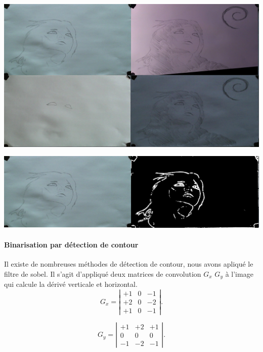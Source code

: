 \begin{center}
\includegraphics[width=\textwidth]{images/diffEclairage.png}
\end{center}

\begin{center}
\includegraphics[width=\textwidth]{images/Threshold1.png}
\end{center}


\paragraph{Binarisation par détection de contour\vspace{0.5cm}\\}

Il existe de nombreuses méthodes de détection de contour, nous avons apliqué le filtre de sobel.
Il s'agit d'appliqué deux matrices de convolution $G_x$ $G_y$ à l'image qui calcule la dérivé verticale et horizontal. 
\[ G_x = \left| \begin{array}{ccc}
+1 & 0 & -1 \\
+2 & 0 & -2 \\
+1 & 0 & -1 \end{array} \right|.\] 

\[ G_y = \left| \begin{array}{ccc}
+1 & +2 & +1 \\
0 & 0 & 0 \\
-1 & -2 & -1 \end{array} \right|.\] 

